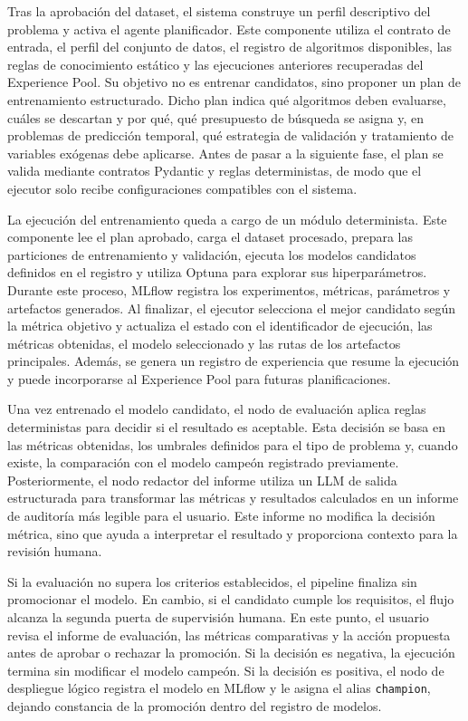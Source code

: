 \documentclass[12pt,a4paper]{article}
\theoremstyle{plain}
\begin{document}
Tras la aprobación del dataset, el sistema construye un perfil descriptivo del problema y activa el agente planificador. Este componente utiliza el contrato de entrada, el perfil del conjunto de datos, el registro de algoritmos disponibles, las reglas de conocimiento estático y las ejecuciones anteriores recuperadas del Experience Pool. Su objetivo no es entrenar candidatos, sino proponer un plan de entrenamiento estructurado. Dicho plan indica qué algoritmos deben evaluarse, cuáles se descartan y por qué, qué presupuesto de búsqueda se asigna y, en problemas de predicción temporal, qué estrategia de validación y tratamiento de variables exógenas debe aplicarse. Antes de pasar a la siguiente fase, el plan se valida mediante contratos Pydantic y reglas deterministas, de modo que el ejecutor solo recibe configuraciones compatibles con el sistema.

La ejecución del entrenamiento queda a cargo de un módulo determinista. Este componente lee el plan aprobado, carga el dataset procesado, prepara las particiones de entrenamiento y validación, ejecuta los modelos candidatos definidos en el registro y utiliza Optuna para explorar sus hiperparámetros. Durante este proceso, MLflow registra los experimentos, métricas, parámetros y artefactos generados. Al finalizar, el ejecutor selecciona el mejor candidato según la métrica objetivo y actualiza el estado con el identificador de ejecución, las métricas obtenidas, el modelo seleccionado y las rutas de los artefactos principales. Además, se genera un registro de experiencia que resume la ejecución y puede incorporarse al Experience Pool para futuras planificaciones.

Una vez entrenado el modelo candidato, el nodo de evaluación aplica reglas deterministas para decidir si el resultado es aceptable. Esta decisión se basa en las métricas obtenidas, los umbrales definidos para el tipo de problema y, cuando existe, la comparación con el modelo campeón registrado previamente. Posteriormente, el nodo redactor del informe utiliza un LLM de salida estructurada para transformar las métricas y resultados calculados en un informe de auditoría más legible para el usuario. Este informe no modifica la decisión métrica, sino que ayuda a interpretar el resultado y proporciona contexto para la revisión humana.

Si la evaluación no supera los criterios establecidos, el pipeline finaliza sin promocionar el modelo. En cambio, si el candidato cumple los requisitos, el flujo alcanza la segunda puerta de supervisión humana. En este punto, el usuario revisa el informe de evaluación, las métricas comparativas y la acción propuesta antes de aprobar o rechazar la promoción. Si la decisión es negativa, la ejecución termina sin modificar el modelo campeón. Si la decisión es positiva, el nodo de despliegue lógico registra el modelo en MLflow y le asigna el alias \texttt{champion}, dejando constancia de la promoción dentro del registro de modelos.
\end{document}
